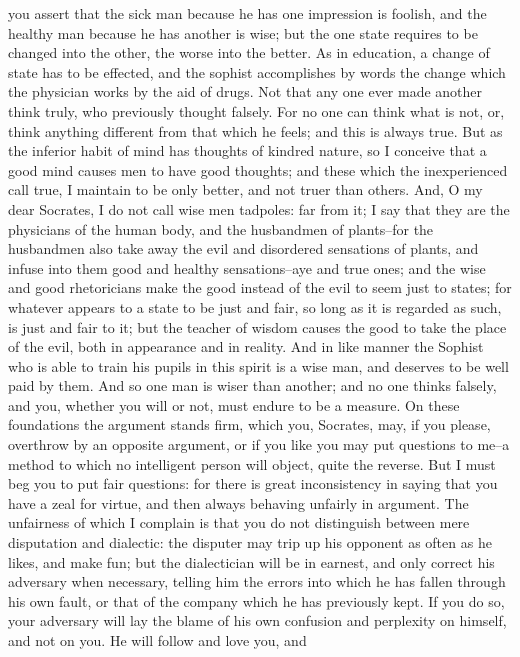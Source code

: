 you assert that the sick man because he has one impression is foolish,
and the healthy man because he has another is wise; but the one state
requires to be changed into the other, the worse into the better. As
in education, a change of state has to be effected, and the sophist
accomplishes by words the change which the physician works by the aid
of drugs. Not that any one ever made another think truly, who previously
thought falsely. For no one can think what is not, or, think anything
different from that which he feels; and this is always true. But as the
inferior habit of mind has thoughts of kindred nature, so I conceive
that a good mind causes men to have good thoughts; and these which the
inexperienced call true, I maintain to be only better, and not truer
than others. And, O my dear Socrates, I do not call wise men tadpoles:
far from it; I say that they are the physicians of the human body, and
the husbandmen of plants--for the husbandmen also take away the evil and
disordered sensations of plants, and infuse into them good and healthy
sensations--aye and true ones; and the wise and good rhetoricians
make the good instead of the evil to seem just to states; for whatever
appears to a state to be just and fair, so long as it is regarded as
such, is just and fair to it; but the teacher of wisdom causes the good
to take the place of the evil, both in appearance and in reality. And in
like manner the Sophist who is able to train his pupils in this spirit
is a wise man, and deserves to be well paid by them. And so one man is
wiser than another; and no one thinks falsely, and you, whether you will
or not, must endure to be a measure. On these foundations the argument
stands firm, which you, Socrates, may, if you please, overthrow by an
opposite argument, or if you like you may put questions to me--a method
to which no intelligent person will object, quite the reverse. But I
must beg you to put fair questions: for there is great inconsistency
in saying that you have a zeal for virtue, and then always behaving
unfairly in argument. The unfairness of which I complain is that you do
not distinguish between mere disputation and dialectic: the disputer
may trip up his opponent as often as he likes, and make fun; but the
dialectician will be in earnest, and only correct his adversary when
necessary, telling him the errors into which he has fallen through his
own fault, or that of the company which he has previously kept. If
you do so, your adversary will lay the blame of his own confusion and
perplexity on himself, and not on you. He will follow and love you, and
